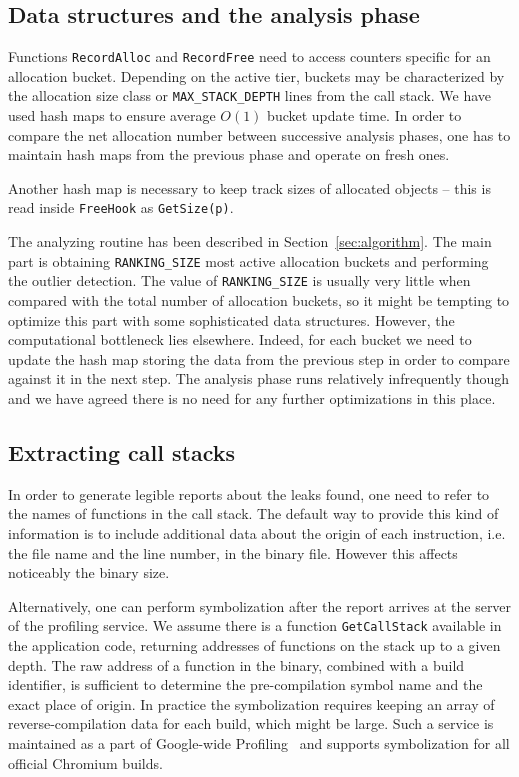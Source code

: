\documentclass[preprint, numbers]{sigplanconf}
\begin{document}
\subsection{Data structures and the analysis phase}

Functions \texttt{RecordAlloc} and \texttt{RecordFree}
need to access counters specific for an allocation bucket. 
Depending on the active tier, buckets may be characterized
by the allocation size class or \texttt{MAX\_STACK\_DEPTH}
lines from the call stack.
We have used hash maps to ensure average $O(1)$ bucket update time.
In order to compare the net allocation number between successive
analysis phases, one has to maintain hash maps from the previous phase
and operate on fresh ones.

Another hash map is necessary to keep track sizes of
allocated objects -- this is read inside \texttt{FreeHook}
as \texttt{GetSize(p)}.

The analyzing routine has been described in Section~\ref{sec:algorithm}.
The main part is obtaining \texttt{RANKING\_SIZE} most
active allocation buckets and performing the outlier detection.
The value of \texttt{RANKING\_SIZE} is usually very little when
compared with the total number of allocation buckets,
so it might be tempting to optimize this part with some sophisticated data structures.
However, the computational bottleneck lies elsewhere.
Indeed, for each bucket we need to update the hash map
storing the data from the previous step in order to compare against
it in the next step.
The analysis phase runs relatively infrequently though and we have agreed there is
no need for any further optimizations in this place.

\subsection{Extracting call stacks}

In order to generate legible reports about the leaks found, one
need to refer to the names of functions in the call stack.
The default way to provide this kind of information is to
include additional data about the origin of each instruction,
i.e. the file name and the line number, in the binary file.
However this affects noticeably the binary size.

Alternatively, one can perform symbolization after the report
arrives at the server of the profiling service.
We assume there is a function \texttt{GetCallStack}
available in the application code, returning addresses of functions on the stack
up to a given depth.
The raw address of a function in the binary, combined with a build identifier,
is sufficient to determine the pre-compilation symbol name and the
exact place of origin.
In practice the symbolization requires keeping an array of reverse-compilation data for each build,
which might be large.
Such a service is maintained as a part of Google-wide Profiling~\cite{gwp}
and supports symbolization for all official Chromium builds.
\end{document}
